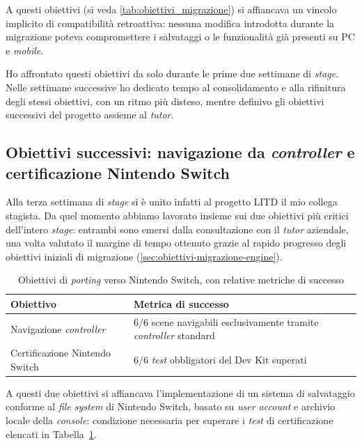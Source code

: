 A questi obiettivi (si veda \ref{tab:obiettivi_migrazione}) si affiancava un vincolo implicito di compatibilità retroattiva: nessuna modifica introdotta durante la migrazione poteva compromettere i salvataggi o le funzionalità già presenti su PC e \textit{mobile}.

Ho affrontato questi obiettivi da solo durante le prime due settimane di \textit{stage}. Nelle settimane successive ho dedicato tempo al consolidamento e alla rifinitura degli stessi obiettivi, con un ritmo più disteso, mentre definivo gli obiettivi successivi del progetto assieme al \textit{tutor}.

\subsection{Obiettivi successivi: navigazione da \textit{controller} e certificazione Nintendo Switch}
\label{sec:obiettivi-controller-certificazione}

Alla terza settimana di \textit{stage} si è unito infatti al progetto LITD il mio collega stagista. Da quel momento abbiamo lavorato insieme sui due obiettivi più critici dell'intero \textit{stage}: entrambi sono emersi dalla consultazione con il \textit{tutor} aziendale, una volta valutato il margine di tempo ottenuto grazie al rapido progresso degli obiettivi iniziali di migrazione (\ref{sec:obiettivi-migrazione-engine}).

\begin{table}[h]
\centering
\begin{tabular}{|p{4.5cm}|p{6.5cm}|}
\hline
\textbf{Obiettivo} & \textbf{Metrica di successo} \\
\hline
Navigazione \textit{controller} & 6/6 scene navigabili esclusivamente tramite \textit{controller} standard \\
\hline
Certificazione Nintendo Switch & 6/6 \textit{test} obbligatori del Dev Kit superati \\
\hline
\end{tabular}
\caption{Obiettivi di \textit{porting} verso Nintendo Switch, con relative metriche di successo}
\label{tab:obiettivi_switch}
\end{table}

A questi due obiettivi si affiancava l'implementazione di un sistema di salvataggio conforme al \textit{file system} di Nintendo Switch, basato su \textit{user account} e archivio locale della \textit{console}: condizione necessaria per superare i \textit{test} di certificazione elencati in Tabella~\ref{tab:obiettivi_switch}.

